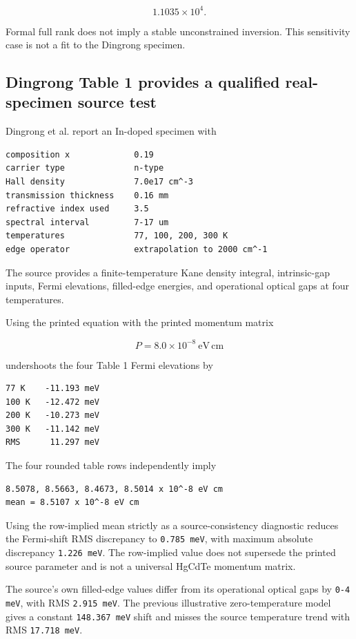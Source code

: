 \documentclass[12pt]{article}
\begin{document}
\[
1.1035\times10^4.
\]

Formal full rank does not imply a stable unconstrained inversion. This sensitivity case is not a fit to the Dingrong specimen.

\subsection{Dingrong Table 1 provides a qualified real-specimen source test}

Dingrong et al. report an In-doped specimen with

\begin{verbatim}
composition x             0.19
carrier type              n-type
Hall density              7.0e17 cm^-3
transmission thickness    0.16 mm
refractive index used     3.5
spectral interval         7-17 um
temperatures              77, 100, 200, 300 K
edge operator             extrapolation to 2000 cm^-1
\end{verbatim}

The source provides a finite-temperature Kane density integral, intrinsic-gap inputs, Fermi elevations, filled-edge energies, and operational optical gaps at four temperatures.

Using the printed equation with the printed momentum matrix

\[
P=8.0\times10^{-8}\ \mathrm{eV\,cm}
\]

undershoots the four Table 1 Fermi elevations by

\begin{verbatim}
77 K    -11.193 meV
100 K   -12.472 meV
200 K   -10.273 meV
300 K   -11.142 meV
RMS      11.297 meV
\end{verbatim}

The four rounded table rows independently imply

\begin{verbatim}
8.5078, 8.5663, 8.4673, 8.5014 x 10^-8 eV cm
mean = 8.5107 x 10^-8 eV cm
\end{verbatim}

Using the row-implied mean strictly as a source-consistency diagnostic reduces the Fermi-shift RMS discrepancy to \texttt{0.785 meV}, with maximum absolute discrepancy \texttt{1.226 meV}. The row-implied value does not supersede the printed source parameter and is not a universal HgCdTe momentum matrix.

The source's own filled-edge values differ from its operational optical gaps by \texttt{0-4 meV}, with RMS \texttt{2.915 meV}. The previous illustrative zero-temperature model gives a constant \texttt{148.367 meV} shift and misses the source temperature trend with RMS \texttt{17.718 meV}.
\end{document}
